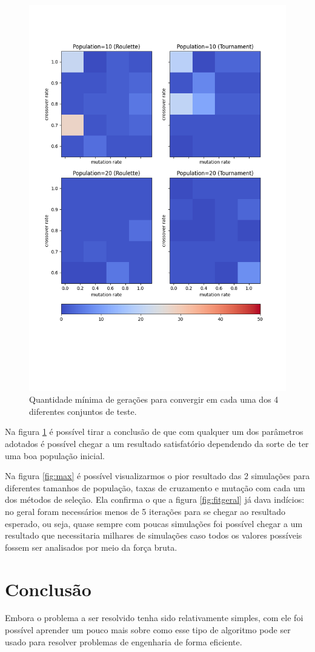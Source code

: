 \documentclass[12pt]{article}
\begin{document}
\begin{figure}
    \centering
    \includegraphics{fig/min_colors.png}
    \caption{Quantidade mínima de gerações para convergir em cada uma dos 4 diferentes conjuntos de teste.}
    \label{fig:min}
\end{figure}

Na figura \ref{fig:min} é possível tirar a conclusão de que com qualquer um dos parâmetros adotados é possível chegar a um resultado satisfatório dependendo da sorte de ter uma boa população inicial.

Na figura \ref{fig:max} é possível visualizarmos o pior resultado das 2 simulações para diferentes tamanhos de população, taxas de cruzamento e mutação com cada um dos métodos de seleção. Ela confirma o que a figura \ref{fig:fitgeral} já dava indícios: no geral foram necessários menos de 5 iterações para se chegar ao resultado esperado, ou seja, quase sempre com poucas simulações foi possível chegar a um resultado que necessitaria milhares de simulações caso todos os valores possíveis fossem ser analisados por meio da força bruta.

\section{Conclusão}

Embora o problema a ser resolvido tenha sido relativamente simples, com ele foi possível aprender um pouco mais sobre como esse tipo de algoritmo pode ser usado para resolver problemas de engenharia de forma eficiente.

\clearpage

\end{document}
